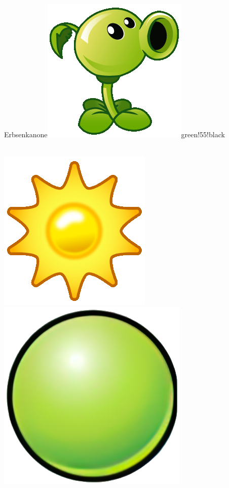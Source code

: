 \documentclass[11pt, a5paper]{article}
\def\now{\hspace{0.2cm}}
\begin{document}
	\begin{mybox}{Erbsenkanone}{\includegraphics[scale=0.1]{pea}}{green!55!black}
		\phantom{My}\\ \\
		\tcblower
		\begin{minipage}[t]{\textwidth}
			\vspace*{-1.2cm}
			\now\includegraphics[scale=0.1]{sun} 
			\now\includegraphics[scale=0.075]{peap} 

\end{minipage}
\end{mybox}
\end{document}

